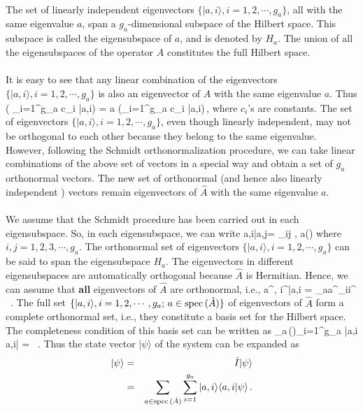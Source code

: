 \paragraph{}
The set of linearly independent eigenvectors $\{ |a,i\rangle, i=1,2, \cdots, g_a\}$, all with the same eigenvalue $a$, span a $g_a$-dimensional subspace of the Hilbert space. This subspace is called the eigensubspace of $a$, and is denoted by $H_a$. The union of all the eigensubspaces of the operator $\hat{A}$ constitutes the full Hilbert space.

\paragraph{}
It is easy to see that any linear combination of the eigenvectors $\{ |a,i\rangle, i=1,2, \cdots, g_a\}$ is also an eigenvector of $\hat{A}$ with the same eigenvalue $a$. Thus
\be
{} \left( \sum_{i=1}^{g_a} c_i |a,i\rangle\right) = a \left(\sum_{i=1}^{g_a} c_i |a,i\rangle\right)\,,
\ee
where $c_i$'s are constants.
The set of eigenvectors $\{ |a,i\rangle, i=1,2, \cdots, g_a\}$, even though linearly independent, may not be orthogonal to each other
because they belong to the same eigenvalue. However, following the Schmidt orthonormalization procedure, we can take linear combinations of the above set of vectors in a special way and obtain a set of $g_a$ orthonormal vectors. The new set of orthonormal (and hence also linearly independent ) vectors remain eigenvectors of $\hat{A}$ with the same eigenvalue $a$. 

\paragraph{}
We assume that the Schmidt procedure has been carried out in each eigensubspace. So, in each eigensubspace, we can write
\be 
\langle a,i|a,j\rangle = \delta_{ij} , \;\; a()
\ee
where $i,j = 1,2,3, \cdots , g_a$. 
The orthonormal set of eigenvectors $\{ |a,i\rangle, i= 1,2, \cdots , g_a\}$ can be said to span the eigensubspace $H_a$.
The eigenvectors in different eigensubspaces are automatically orthogonal because $\hat{A}$ is Hermitian. Hence, we can assume that 
{\bf all}  eigenvectors of $\hat{A}$ are orthonormal, i.e.,
\be
\langle a^{\prime}, i^{\prime}|a,i \rangle = \delta_{aa^{\prime}}\delta_{ii^{\prime}} \, .
\ee
The full set $\{ |a, i\rangle, i=1,2, \cdots , g_a;\, a\in {\rm spec}\,(\hat{A}) \}$ of eigenvectors of $\hat{A}$ form a complete 
orthonormal set, i.e., they constitute a basis set for the Hilbert space. The completeness condition of this basis set can be written as 
\be 
\sum_{a\,()}\sum_{i=1}^{g_a} |a,i \rangle \langle a,i| = \, .
\ee
Thus the state vector $|\psi\rangle$ of the system can be expanded as
\begin{eqnarray}
|\psi\rangle & = & \hat{I} |\psi\rangle \nonumber \\
             & = & \sum_{a\in {\rm spec}\,(\hat{A})}\sum_{i=1}^{g_a} |a,i \rangle \langle a,i|\psi\rangle\, .
\end{eqnarray}			

